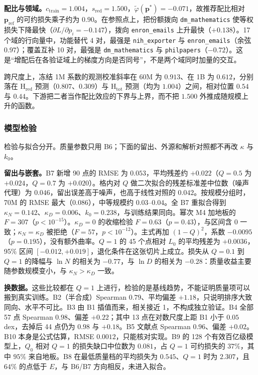 \textbf{配比与领域。}$c_{\mathrm{train}}=1.004$，$s_{\mathrm{red}}=1.500$，$\tilde\varphi(\mathbf{p}^*)=-0.071$，故推荐配比相对 $\mathbf{p}_{\mathrm{ref}}$ 的可约损失乘子约为 $0.90$。在参照点上，把份额拨向 \texttt{dm\_mathematics} 使等权损失下降最快（$\partial L/\partial p_i=-0.147$），拨向 \texttt{enron\_emails} 上升最快（$+0.138$）。17 个域的行向量中，功能替代 4 对，最强是 \texttt{nih\_exporter} 与 \texttt{enron\_emails}（余弦 $0.97$）；覆盖互补 10 对，最强是 \texttt{dm\_mathematics} 与 \texttt{philpapers}（$-0.72$）。这是“增配后在各验证域上的梯度方向是否同号”，不是两个域同时加量的交互。

跨尺度上，冻结 1M 系数的观测校准斜率在 60M 为 $0.913$、在 1B 为 $0.612$，分别落在 H$_{\mathrm{red}}$ 预测（$0.807$、$0.309$）与 H$_{\mathrm{tot}}$ 预测（均为 $1.004$）之间，相对位置 $0.54$ 与 $0.44$。下游把二者当作配比效应的下界与上界，而不把 $1.500$ 外推成随规模上升的函数。

\subsubsection{模型检验}

检验与拟合分开。质量参数只用 B6；下面的留出、外源和解析对照都不再改 $\kappa$ 与 $k_0$。

\textbf{留出与嵌套。}B7 新增 90 点的 RMSE 为 $0.053$，平均残差约 $+0.022$（$Q=0.5$ 为 $+0.024$，$Q=0.7$ 为 $+0.020$）。格内对 $Q$ 做二次拟合的残差标准差中位数（噪声代理）为 $0.046$，留出误差高于噪声，也高于线性对照的 $0.042$。按规模分组时，70M 的 RMSE 最大（$0.086$），中等规模约 $0.03$--$0.04$。全 B7 重拟合得到 $\kappa_N=0.142$、$\kappa_D=0.006$、$k_0=0.238$，与训练结果同向。幂次 M4 加地板的 $F=307$（$p<10^{-15}$）。$\kappa_D=0$ 的收缩检验 $F=0.63$（$p=0.43$），与区间含 0 一致；$\kappa_N=\kappa_D$ 被拒绝（$F=57$，$p<10^{-12}$）。主式再加 $(1-Q)^2$，系数 $-0.0095$（$p=0.195$），没有额外曲率。$Q=1$ 的 45 个点相对 $L_0$ 的平均残差为 $+0.0036$，95\% 区间 $[-0.012,+0.019]$，退化条件在这张切片上成立。损失从 $Q=0.1$ 到 $Q=1$ 的降幅与 $\ln N$ 的相关为 $-0.77$，与 $\ln D$ 的相关为 $-0.28$：质量收益主要随参数规模变小，与 $\kappa_N>\kappa_D$ 一致。

\textbf{换数据。}这些比较都在 $Q=1$ 上进行，检验的是基线趋势，不能证明质量项可以搬到真实训练。B2（半合成）Spearman $0.79$、平均偏差 $+1.18$，只说明排序大致同向、水平不可比。B3 由 B1 插值而来，相关接近 1，不构成独立验证。B4 全部 57 点 Spearman $0.98$、偏差 $+0.22$；其中 13 点在对数尺度上距 B1 小于 $0.05$ dex，去掉后 44 点仍为 $0.98$ 与 $+0.18$。B5 文献点 Spearman $0.96$、偏差 $+0.02$。B10 本身是公式估算，RMSE $0.0012$，只能核对实现。B9 的 128 个有效百亿级模型上，$Q_0$ 相对 $Q=1$ 的损失缺口中位数为 $0.081$，占 $Q=1$ 可约损失的 $37\%$，其中 $95\%$ 来自地板。B8 在最低质量档的平均损失为 $0.545$、$Q=1$ 时为 $2.307$，且 $64\%$ 的点低于 $E$，与 B6/B7 方向相反，未进入拟合。

